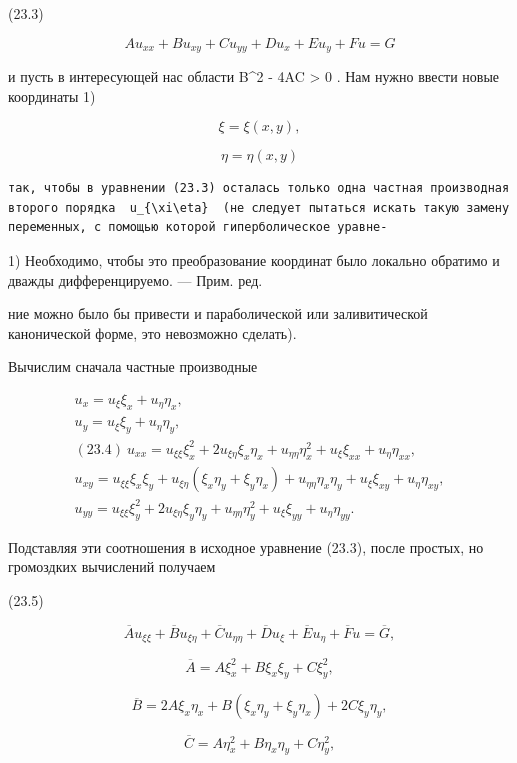 \documentclass[
  ukrainian,
]{article}
\begin{document}
(23.3)

\[
Au_{xx} + Bu_{xy} + Cu_{yy} + Du_x + Eu_y + Fu = G
\]

и пусть в интересующей нас области B\^{}2 - 4AC \textgreater{} 0 . Нам
нужно ввести новые координаты 1)

\[
\xi = \xi(x, y),
\]

\[
\eta = \eta(x, y)
\]

\begin{verbatim}
так, чтобы в уравнении (23.3) осталась только одна частная производная второго порядка  u_{\xi\eta}  (не следует пытаться искать такую замену переменных, с помощью которой гиперболическое уравне-
\end{verbatim}

1) Необходимо, чтобы это преобразование координат было локально обратимо
и дважды дифференцируемо. --- Прим. ред.

ние можно было бы привести и параболической или заливитической
канонической форме, это невозможно сделать).

Вычислим сначала частные производные

\[
\begin{array}{c} u_x = u_\xi \xi_x + u_\eta \eta_x, \\ u_y = u_\xi \xi_y + u_\eta \eta_y, \\ (23.4) \ u_{xx} = u_{\xi\xi} \xi_x^2 + 2u_{\xi\eta} \xi_x \eta_x + u_{\eta\eta} \eta_x^2 + u_{\xi} \xi_{xx} + u_{\eta} \eta_{xx}, \\ u_{xy} = u_{\xi\xi} \xi_x \xi_y + u_{\xi\eta} (\xi_x \eta_y + \xi_y \eta_x) + u_{\eta\eta} \eta_x \eta_y + u_{\xi} \xi_{xy} + u_{\eta} \eta_{xy}, \\ u_{yy} = u_{\xi\xi} \xi_y^2 + 2u_{\xi\eta} \xi_y \eta_y + u_{\eta\eta} \eta_y^2 + u_{\xi} \xi_{yy} + u_{\eta} \eta_{yy}. \end{array}
\]

Подставляя эти соотношения в исходное уравнение (23.3), после простых,
но громоздких вычислений получаем

(23.5)

\[
\overline{A}u_{\xi\xi} + \overline{B}u_{\xi\eta} + \overline{C}u_{\eta\eta} + \overline{D}u_{\xi} + \overline{E}u_{\eta} + \overline{F}u = \overline{G},
\]

\[
\overline{A} = A\xi_{x}^{2} + B\xi_{x}\xi_{y} + C\xi_{y}^{2},
\]

\[
\overline{B} = 2A\xi_{x}\eta_{x} + B(\xi_{x}\eta_{y} + \xi_{y}\eta_{x}) + 2C\xi_{y}\eta_{y},
\]

\[
\overline{C} = A\eta_{x}^{2} + B\eta_{x}\eta_{y} + C\eta_{y}^{2},
\]
\end{document}
